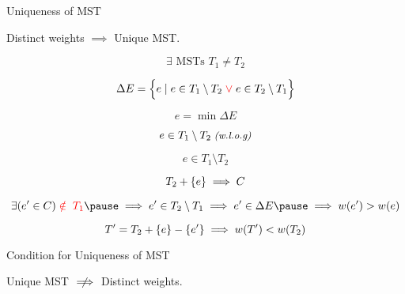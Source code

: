 
\begin{frame}
  \centerline{}
\end{frame}

\begin{frame}
  \begin{exampleblock}{Uniqueness of MST }
    \centerline{Distinct weights $\implies$ Unique MST.}
  \end{exampleblock}

  \pause
  \vspace{0.50cm}
  \centerline{}

  \pause
  \[
    \exists \text{ MSTs } T_1 \neq T_2
  \]

  \pause
  \[
	\Delta E = \Big\{e \mid e \in T_1 \setminus T_2 \;\textcolor{red}{\lor}\; e \in T_2 \setminus T_1\Big\}
  \]

  \pause
  \[
    e = \min \Delta E
  \]

  \pause
  \[
    e \in T_1 \setminus T_2 \;\text{\small \it (w.l.o.g)}
  \]
\end{frame}

\begin{frame}
  \[
    e \in T_1 \setminus T_2
  \]


  \pause
  \vspace{-0.30cm}
  \[
    T_2 + \{e\} \implies C
  \]

  \pause
  \vspace{-0.30cm}
  \[
    \exists (e' \in C) \red{\;\notin\; T_1} \pause \implies e' \in T_{2} \setminus T_{1} \implies e' \in \Delta E \pause \implies w(e') > w(e)
  \]

  \pause
  \vspace{-0.50cm}
  \[
    T' = T_{2} + \{e\} - \{e'\} \implies w(T') < w(T_{2})
  \]
\end{frame}

\begin{frame}{}
  \begin{exampleblock}{Condition for Uniqueness of MST }
    \centerline{Unique MST $\centernot\implies$ Distinct weights.}
  \end{exampleblock}

  \pause
\end{frame}

